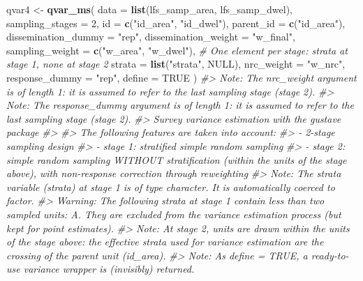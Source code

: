 \documentclass[
]{article}
\newenvironment{Shaded}{\begin{snugshade}}{\end{snugshade}}
\newcommand{\AttributeTok}[1]{\textcolor[rgb]{0.13,0.29,0.53}{#1}}
\newcommand{\CommentTok}[1]{\textcolor[rgb]{0.56,0.35,0.01}{\textit{#1}}}
\newcommand{\ConstantTok}[1]{\textcolor[rgb]{0.56,0.35,0.01}{#1}}
\newcommand{\DecValTok}[1]{\textcolor[rgb]{0.00,0.00,0.81}{#1}}
\newcommand{\FunctionTok}[1]{\textcolor[rgb]{0.13,0.29,0.53}{\textbf{#1}}}
\newcommand{\NormalTok}[1]{#1}
\newcommand{\OtherTok}[1]{\textcolor[rgb]{0.56,0.35,0.01}{#1}}
\newcommand{\StringTok}[1]{\textcolor[rgb]{0.31,0.60,0.02}{#1}}
\newcounter{none} %
\begin{document}
\begin{Shaded}
\begin{Highlighting}[]
\NormalTok{qvar4 }\OtherTok{\textless{}{-}} \FunctionTok{qvar\_ms}\NormalTok{(}
  \AttributeTok{data =} \FunctionTok{list}\NormalTok{(lfs\_samp\_area, lfs\_samp\_dwel),}
  \AttributeTok{sampling\_stages =} \DecValTok{2}\NormalTok{,}
  \AttributeTok{id =} \FunctionTok{c}\NormalTok{(}\StringTok{"id\_area"}\NormalTok{, }\StringTok{"id\_dwel"}\NormalTok{),}
  \AttributeTok{parent\_id =} \FunctionTok{c}\NormalTok{(}\StringTok{"id\_area"}\NormalTok{),}
  \AttributeTok{dissemination\_dummy =} \StringTok{"rep"}\NormalTok{,}
  \AttributeTok{dissemination\_weight =} \StringTok{"w\_final"}\NormalTok{,}
  \AttributeTok{sampling\_weight =} \FunctionTok{c}\NormalTok{(}\StringTok{"w\_area"}\NormalTok{, }\StringTok{"w\_dwel"}\NormalTok{),}
  \CommentTok{\# One element per stage: strata at stage 1, none at stage 2}
  \AttributeTok{strata =} \FunctionTok{list}\NormalTok{(}\StringTok{"strata"}\NormalTok{, }\ConstantTok{NULL}\NormalTok{),}
  \AttributeTok{nrc\_weight =} \StringTok{"w\_nrc"}\NormalTok{,}
  \AttributeTok{response\_dummy =} \StringTok{"rep"}\NormalTok{,}
  \AttributeTok{define =} \ConstantTok{TRUE}
\NormalTok{)}
\CommentTok{\#\textgreater{} Note: The nrc\_weight argument is of length 1: it is assumed to refer to the last sampling stage (stage 2).}
\CommentTok{\#\textgreater{} Note: The response\_dummy argument is of length 1: it is assumed to refer to the last sampling stage (stage 2).}
\CommentTok{\#\textgreater{} Survey variance estimation with the gustave package}
\CommentTok{\#\textgreater{} }
\CommentTok{\#\textgreater{} The following features are taken into account:}
\CommentTok{\#\textgreater{}   {-} 2{-}stage sampling design}
\CommentTok{\#\textgreater{}   {-} stage 1: stratified simple random sampling}
\CommentTok{\#\textgreater{}   {-} stage 2: simple random sampling WITHOUT stratification (within the units of the stage above), with non{-}response correction through reweighting}
\CommentTok{\#\textgreater{} Note: The strata variable (strata) at stage 1 is of type character. It is automatically coerced to factor.}
\CommentTok{\#\textgreater{} Warning: The following strata at stage 1 contain less than two sampled units: A. They are excluded from the variance estimation process (but kept for point estimates).}
\CommentTok{\#\textgreater{} Note: At stage 2, units are drawn within the units of the stage above: the effective strata used for variance estimation are the crossing of the parent unit (id\_area).}
\CommentTok{\#\textgreater{} Note: As define = TRUE, a ready{-}to{-}use variance wrapper is (invisibly) returned.}
\end{Highlighting}
\end{Shaded}
\end{document}
